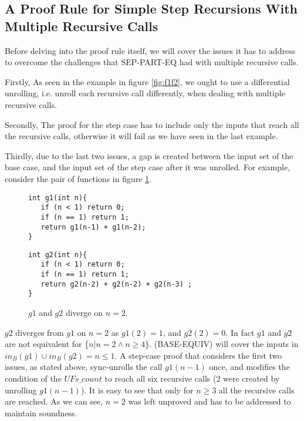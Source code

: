 \subsection{A Proof Rule for Simple Step Recursions With Multiple Recursive Calls}
\label{sec:adaptstep}
Before delving into the proof rule itself, we will cover the issues it has to address to overcome the challenges that SEP-PART-EQ had with multiple recursive calls.

Firstly, As seen in the example in figure \ref{fig:f1f2}, we ought to use a differential unrolling, i.e. unroll each recursive call differently, when dealing with multiple recursive calls.

Secondly, The proof for the step case has to include only the inputs that reach all the recursive calls, otherwise it will fail as we have seen in the last example.

Thirdly, due to the last two issues, a gap is created between the input set of the base case, and the input set of the step case after it was unrolled. For example, consider the pair of functions in figure \ref{fig:g1g2neq}.
\begin{figure}[h]
\begin{center}
\begin{minipage}{7 cm}
\begin{lstlisting}
int g1(int n){
   if (n < 1) return 0;
   if (n == 1) return 1; 
   return g1(n-1) + g1(n-2);
}
\end{lstlisting}
\end{minipage}
\begin{minipage}{7 cm}
\begin{lstlisting}
int g2(int n){
   if (n < 1) return 0;
   if (n == 1) return 1; 
   return g2(n-2) + g2(n-2) + g2(n-3) ;
}
\end{lstlisting}
\end{minipage}
\caption{$g1$ and $g2$ diverge on $n=2$.}
\label{fig:g1g2neq}
\end{center}
\end{figure}
$g2$ diverges from $g1$ on $n=2$ as $g1(2) = 1$, and $g2(2) = 0$. In fact $g1$ and $g2$ are not equivalent for \{$n | n = 2 \wedge n \geq 4$\}. (BASE-EQUIV) will cover the inputs in $in_B(g1) \cup in_B(g2) = {n \leq 1}$. A step-case proof that considers the first two issues, as stated above, sync-unrolls the call $g1(n-1)$ once, and modifies the condition of the $UFs\_count$ to reach all six recursive calls (2 were created by unrolling $g1(n-1)$). It is easy to see that only for $n \geq 3$ all the recursive calls are reached. As we can see, $n = 2$ was left unproved and has to be addressed to maintain soundness. 

